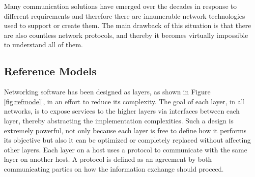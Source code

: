 Many communication solutions have emerged over the decades in response to different requirements and therefore there are innumerable network technologies used to support or create them. The main drawback of this situation is that there are also countless network protocols, and thereby it becomes virtually impossible to understand all of them. 

\subsection{Reference Models}

Networking software has been designed as layers, as shown in Figure \ref{fig:refmodel}, in an effort to reduce its complexity. The goal of each layer, in all networks, is to expose services to the higher layers via interfaces between each layer, thereby abstracting the implementation complexities. Such a design is extremely powerful, not only because each layer is free to define how it performs its objective but also it can be optimized or completely replaced without affecting other layers. Each layer on a host uses a protocol to communicate with the same layer on another host. A protocol is defined as an agreement by both communicating parties on how the information exchange should proceed.


